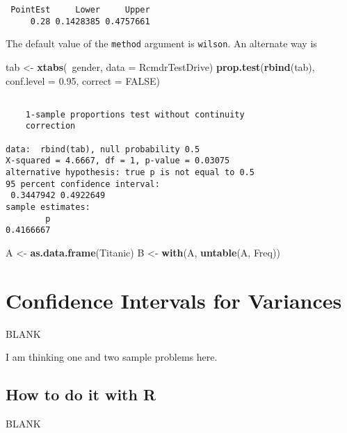 \documentclass[]{book}
\newenvironment{Shaded}{\begin{snugshade}}{\end{snugshade}}
\newcommand{\KeywordTok}[1]{\textcolor[rgb]{0.13,0.29,0.53}{\textbf{{#1}}}}
\newcommand{\DataTypeTok}[1]{\textcolor[rgb]{0.13,0.29,0.53}{{#1}}}
\newcommand{\FloatTok}[1]{\textcolor[rgb]{0.00,0.00,0.81}{{#1}}}
\newcommand{\StringTok}[1]{\textcolor[rgb]{0.31,0.60,0.02}{{#1}}}
\newcommand{\OtherTok}[1]{\textcolor[rgb]{0.56,0.35,0.01}{{#1}}}
\newcommand{\NormalTok}[1]{{#1}}
\numberwithin{equation}{chapter}
\numberwithin{figure}{chapter}
\theoremstyle{plain}
\theoremstyle{definition}
\theoremstyle{remark}
\theoremstyle{definition}
\theoremstyle{definition}
\theoremstyle{remark}
\begin{document}
\begin{verbatim}
 PointEst     Lower     Upper
     0.28 0.1428385 0.4757661
\end{verbatim}

The default value of the \texttt{method} argument is \texttt{wilson}. An
alternate way is

\begin{Shaded}
\begin{Highlighting}[]
\NormalTok{tab <-}\StringTok{ }\KeywordTok{xtabs}\NormalTok{(~gender, }\DataTypeTok{data =} \NormalTok{RcmdrTestDrive)}
\KeywordTok{prop.test}\NormalTok{(}\KeywordTok{rbind}\NormalTok{(tab), }\DataTypeTok{conf.level =} \FloatTok{0.95}\NormalTok{, }\DataTypeTok{correct =} \OtherTok{FALSE}\NormalTok{)}
\end{Highlighting}
\end{Shaded}

\begin{verbatim}

    1-sample proportions test without continuity
    correction

data:  rbind(tab), null probability 0.5
X-squared = 4.6667, df = 1, p-value = 0.03075
alternative hypothesis: true p is not equal to 0.5
95 percent confidence interval:
 0.3447942 0.4922649
sample estimates:
        p 
0.4166667 
\end{verbatim}

\begin{Shaded}
\begin{Highlighting}[]
\NormalTok{A <-}\StringTok{ }\KeywordTok{as.data.frame}\NormalTok{(Titanic)}
\NormalTok{B <-}\StringTok{ }\KeywordTok{with}\NormalTok{(A, }\KeywordTok{untable}\NormalTok{(A, Freq))}
\end{Highlighting}
\end{Shaded}

\section{Confidence Intervals for
Variances}\label{sec-confidence-intervals-for-variances}

BLANK

I am thinking one and two sample problems here.

\subsection{How to do it with R}\label{how-to-do-it-with-r-37}

BLANK
\end{document}
